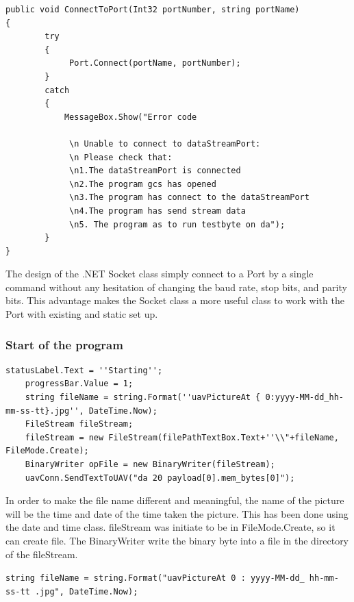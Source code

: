 \documentclass[oneside]{ecsgdp}         %
\begin{document}
\begin{lstlisting}[caption={connect to port},label=lst:connectT]
public void ConnectToPort(Int32 portNumber, string portName)
{
        try            
        {
             Port.Connect(portName, portNumber);                
        }            
        catch 
        {            
            MessageBox.Show("Error code
                
             \n Unable to connect to dataStreamPort:
             \n Please check that:                
             \n1.The dataStreamPort is connected                 
             \n2.The program gcs has opened                 
             \n3.The program has connect to the dataStreamPort                
             \n4.The program has send stream data                
             \n5. The program as to run testbyte on da");                
        }            
}
        \end{lstlisting}

        
	The design of the .NET Socket class simply connect to a Port by a single command without any hesitation of changing the baud rate, stop bits, and parity bits. This advantage makes the Socket class a more useful class to work with the Port with existing and static set up. 

\subsubsection*{Start of the program}

\begin{lstlisting}[caption={Start of the program}, label=lst:payload_shared_mem_set]
	statusLabel.Text = ''Starting'';   
	progressBar.Value = 1;   
	string fileName = string.Format(''uavPictureAt { 0:yyyy-MM-dd_hh-mm-ss-tt}.jpg'', DateTime.Now);
	FileStream fileStream;
	fileStream = new FileStream(filePathTextBox.Text+''\\"+fileName, FileMode.Create);      
	BinaryWriter opFile = new BinaryWriter(fileStream);
	uavConn.SendTextToUAV("da 20 payload[0].mem_bytes[0]");      
 \end{lstlisting}
             In order to make the file name different and meaningful, the name of the picture will be the time and date of the time taken the picture. This has been done using the date and time class. fileStream was initiate to be in FileMode.Create, so it can create file. The BinaryWriter write the binary byte into a file in the directory of the fileStream. 
            
\texttt{string fileName = string.Format("uavPictureAt{ 0 : yyyy-MM-dd\_ hh-mm-ss-tt}
 .jpg", DateTime.Now);   }  
        
\end{document}
